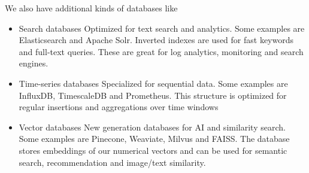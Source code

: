We also have additional kinds of databases like
\begin{itemize}
    \item Search databases \ra Optimized for text search and analytics. Some examples are Elasticsearch and Apache Solr. Inverted indexes are used for fast keywords and full-text queries. These are great for log analytics, monitoring and search engines.
    \item Time-series databases \ra Specialized for sequential data. Some examples are InfluxDB, TimescaleDB and Prometheus. This structure is optimized for regular insertions and aggregations over time windows
    \item Vector databases \ra New generation databases for AI and similarity search. Some examples are Pinecone, Weaviate, Milvus and FAISS. The database stores embeddings of our numerical vectors and can be used for semantic search, recommendation and image/text similarity.
\end{itemize}















